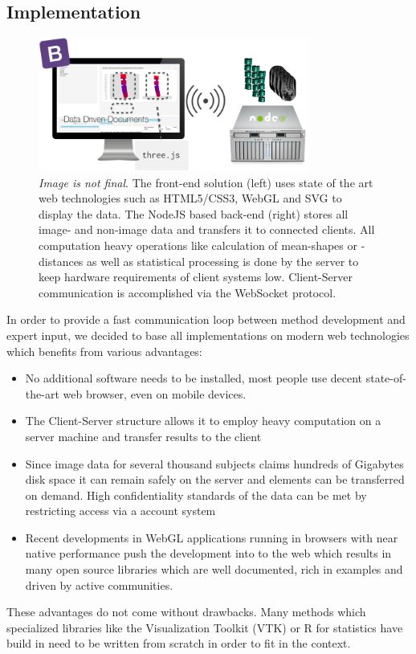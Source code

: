 \documentclass[journal]{style/vgtc} 			          %
\begin{document}
\subsection{Implementation}
\begin{figure}[htb]
 \centering
 \label{fig:technologies}
 \includegraphics[width=3.5in]{figures/technologies}
 \caption{\emph{Image is not final}. The front-end solution (left) uses state of the art web technologies such as HTML5/CSS3, WebGL and SVG to display the data.
 The NodeJS based back-end (right) stores all image- and non-image data and transfers it to connected clients.
 All computation heavy operations like calculation of mean-shapes or -distances as well as statistical processing is done by the server to keep hardware requirements of client systems low. 
 Client-Server communication is accomplished via the WebSocket protocol.
 }
\end{figure}
%
In order to provide a fast communication loop between method development and expert input, we decided to base all implementations on modern web technologies which benefits from various advantages:
\begin{itemize}
	\item No additional software needs to be installed, most people use decent state-of-the-art web browser, even on mobile devices.
	\item The Client-Server structure allows it to employ heavy computation on a server machine and transfer results to the client
	\item Since image data for several thousand subjects claims hundreds of Gigabytes disk space it can remain safely on the server and elements can be transferred on demand.
	High confidentiality standards of the data can be met by restricting access via a account system
	\item Recent developments in WebGL applications running in browsers with near native performance push the development into to the web which results in many open source libraries which are well documented, rich in examples and driven by active communities.
\end{itemize}
These advantages do not come without drawbacks.
%
Many methods which specialized libraries like the Visualization Toolkit (VTK) or R for statistics have build in need to be written from scratch in order to fit in the context.
%
\end{document}
